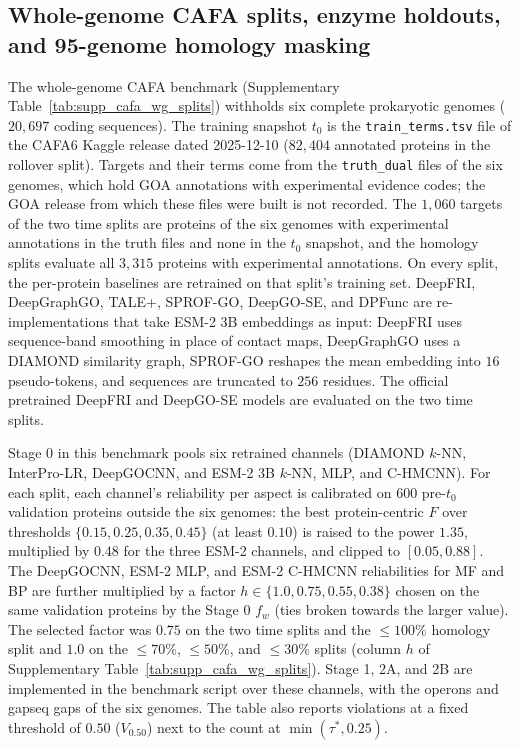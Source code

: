 \documentclass[10pt]{article}
\newcommand{\fn}[1]{\nolinkurl{#1}}
\begin{document}
\subsection{Whole-genome CAFA splits, enzyme holdouts, and 95-genome homology masking}

The whole-genome CAFA benchmark (Supplementary Table~\ref{tab:supp_cafa_wg_splits}) withholds six complete prokaryotic genomes ($20{,}697$ coding sequences). The training snapshot $t_0$ is the \fn{train_terms.tsv} file of the CAFA6 Kaggle release dated 2025-12-10 ($82{,}404$ annotated proteins in the rollover split). Targets and their terms come from the \fn{truth_dual} files of the six genomes, which hold GOA annotations with experimental evidence codes; the GOA release from which these files were built is not recorded. The $1{,}060$ targets of the two time splits are proteins of the six genomes with experimental annotations in the truth files and none in the $t_0$ snapshot, and the homology splits evaluate all $3{,}315$ proteins with experimental annotations. On every split, the per-protein baselines are retrained on that split's training set. DeepFRI, DeepGraphGO, TALE+, SPROF-GO, DeepGO-SE, and DPFunc are re-implementations that take ESM-2 3B embeddings as input: DeepFRI uses sequence-band smoothing in place of contact maps, DeepGraphGO uses a DIAMOND similarity graph, SPROF-GO reshapes the mean embedding into $16$ pseudo-tokens, and sequences are truncated to $256$ residues. The official pretrained DeepFRI and DeepGO-SE models are evaluated on the two time splits.

Stage 0 in this benchmark pools six retrained channels (DIAMOND $k$-NN, InterPro-LR, DeepGOCNN, and ESM-2 3B $k$-NN, MLP, and C-HMCNN). For each split, each channel's reliability per aspect is calibrated on $600$ pre-$t_0$ validation proteins outside the six genomes: the best protein-centric $F$ over thresholds $\{0.15, 0.25, 0.35, 0.45\}$ (at least $0.10$) is raised to the power $1.35$, multiplied by $0.48$ for the three ESM-2 channels, and clipped to $[0.05, 0.88]$. The DeepGOCNN, ESM-2 MLP, and ESM-2 C-HMCNN reliabilities for MF and BP are further multiplied by a factor $h \in \{1.0, 0.75, 0.55, 0.38\}$ chosen on the same validation proteins by the Stage 0 $f_w$ (ties broken towards the larger value). The selected factor was $0.75$ on the two time splits and the $\le 100\%$ homology split and $1.0$ on the $\le 70\%$, $\le 50\%$, and $\le 30\%$ splits (column $h$ of Supplementary Table~\ref{tab:supp_cafa_wg_splits}). Stage 1, 2A, and 2B are implemented in the benchmark script over these channels, with the operons and gapseq gaps of the six genomes. The table also reports violations at a fixed threshold of $0.50$ ($V_{0.50}$) next to the count at $\min(\tau^{*}, 0.25)$.
\end{document}
